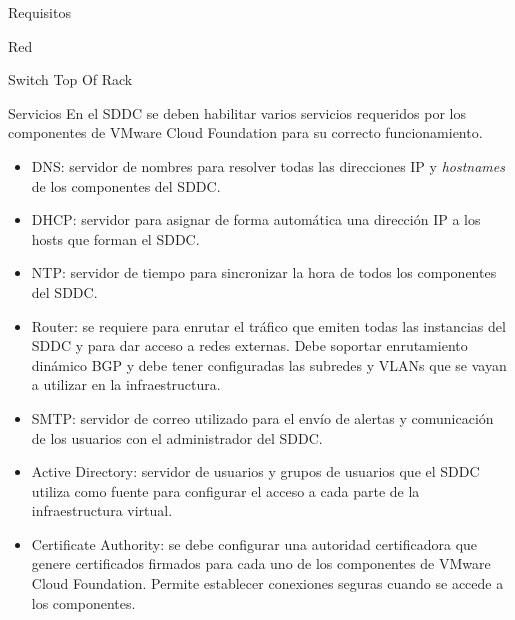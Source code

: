 \begin{section}{Requisitos}
\begin{subsection}{Red}
\begin{subsubsection}{Switch Top Of Rack}
 \end{subsubsection}
 \begin{subsubsection}{Servicios}
     En el SDDC se deben habilitar varios servicios requeridos por los componentes de VMware Cloud Foundation para su correcto funcionamiento.
     \begin{itemize}
         \item DNS: servidor de nombres para resolver todas las direcciones IP y \textit{hostnames} de los componentes del SDDC.
         \item DHCP: servidor para asignar de forma automática una dirección IP a los hosts que forman el SDDC.
         \item NTP: servidor de tiempo para sincronizar la hora de todos los componentes del SDDC.
         \item Router: se requiere para enrutar el tráfico que emiten todas las instancias del SDDC y para dar acceso a redes externas. Debe soportar enrutamiento dinámico BGP y debe tener configuradas las subredes y VLANs que se vayan a utilizar en la infraestructura.
         \item SMTP: servidor de correo utilizado para el envío de alertas y comunicación de los usuarios con el administrador del SDDC.
         \item Active Directory: servidor de usuarios y grupos de usuarios que el SDDC utiliza como fuente para configurar el acceso a cada parte de la infraestructura virtual.
         \item Certificate Authority: se debe configurar una autoridad certificadora que genere certificados firmados para cada uno de los componentes de VMware Cloud Foundation. Permite establecer conexiones seguras cuando se accede a los componentes.
     \end{itemize}
 \end{subsubsection}
\end{subsection}
\end{section}


